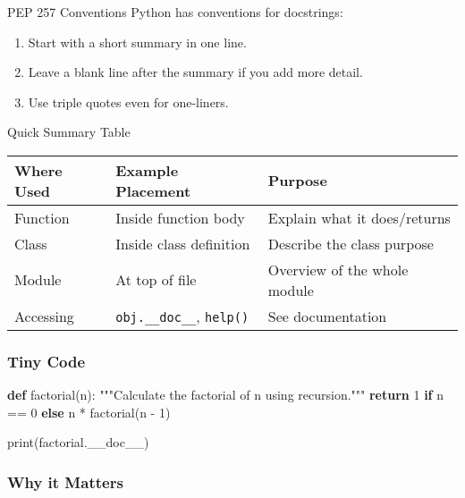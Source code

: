 \documentclass[
  letterpaper,
  DIV=11,
  numbers=noendperiod]{scrreprt}
\newenvironment{Shaded}{\begin{snugshade}}{\end{snugshade}}
\newcommand{\BuiltInTok}[1]{\textcolor[rgb]{0.00,0.23,0.31}{#1}}
\newcommand{\CommentTok}[1]{\textcolor[rgb]{0.37,0.37,0.37}{#1}}
\newcommand{\ControlFlowTok}[1]{\textcolor[rgb]{0.00,0.23,0.31}{\textbf{#1}}}
\newcommand{\DecValTok}[1]{\textcolor[rgb]{0.68,0.00,0.00}{#1}}
\newcommand{\KeywordTok}[1]{\textcolor[rgb]{0.00,0.23,0.31}{\textbf{#1}}}
\newcommand{\NormalTok}[1]{\textcolor[rgb]{0.00,0.23,0.31}{#1}}
\newcommand{\OperatorTok}[1]{\textcolor[rgb]{0.37,0.37,0.37}{#1}}
\providecommand{\tightlist}{%
  \setlength{\itemsep}{0pt}\setlength{\parskip}{0pt}}
\begin{document}
PEP 257 Conventions Python has conventions for docstrings:

\begin{enumerate}
\def\labelenumi{\arabic{enumi}.}
\tightlist
\item
  Start with a short summary in one line.
\item
  Leave a blank line after the summary if you add more detail.
\item
  Use triple quotes even for one-liners.
\end{enumerate}

Quick Summary Table

\begin{longtable}[]{@{}lll@{}}
\toprule\noalign{}
Where Used & Example Placement & Purpose \\
\midrule\noalign{}
\endhead
\bottomrule\noalign{}
\endlastfoot
Function & Inside function body & Explain what it does/returns \\
Class & Inside class definition & Describe the class purpose \\
Module & At top of file & Overview of the whole module \\
Accessing & \texttt{obj.\_\_doc\_\_}, \texttt{help()} & See
documentation \\
\end{longtable}

\subsubsection{Tiny Code}\label{tiny-code-37}

\begin{Shaded}
\begin{Highlighting}[]
\KeywordTok{def}\NormalTok{ factorial(n):}
    \CommentTok{"""Calculate the factorial of n using recursion."""}
    \ControlFlowTok{return} \DecValTok{1} \ControlFlowTok{if}\NormalTok{ n }\OperatorTok{==} \DecValTok{0} \ControlFlowTok{else}\NormalTok{ n }\OperatorTok{*}\NormalTok{ factorial(n }\OperatorTok{{-}} \DecValTok{1}\NormalTok{)}

\BuiltInTok{print}\NormalTok{(factorial.\_\_doc\_\_)}
\end{Highlighting}
\end{Shaded}

\subsubsection{Why it Matters}\label{why-it-matters-37}
\end{document}
